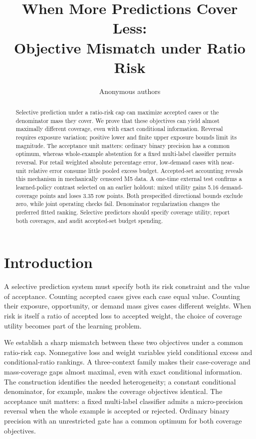 \documentclass{article}
\title{When More Predictions Cover Less:\\Objective Mismatch under Ratio Risk}
\author{Anonymous authors}
\begin{document}
\maketitle
{}
\begin{abstract}
Selective prediction under a ratio-risk cap can maximize accepted cases or the denominator mass they cover. We prove that these objectives can yield almost maximally different coverage, even with exact conditional information. Reversal requires exposure variation; positive lower and finite upper exposure bounds limit its magnitude. The acceptance unit matters: ordinary binary precision has a common optimum, whereas whole-example abstention for a fixed multi-label classifier permits reversal. For retail weighted absolute percentage error, low-demand cases with near-unit relative error consume little pooled excess budget. Accepted-set accounting reveals this mechanism in mechanically censored M5 data. A one-time external test confirms a learned-policy contrast selected on an earlier holdout: mixed utility gains 5.16 demand-coverage points and loses 3.35 row points. Both prespecified directional bounds exclude zero, while joint operating checks fail. Denominator regularization changes the preferred fitted ranking. Selective predictors should specify coverage utility, report both coverages, and audit accepted-set budget spending.
\end{abstract}

\section{Introduction}
A selective prediction system must specify both its risk constraint and the value of acceptance. Counting accepted cases gives each case equal value. Counting their exposure, opportunity, or demand mass gives cases different weights. When risk is itself a ratio of accepted loss to accepted weight, the choice of coverage utility becomes part of the learning problem.

We establish a sharp mismatch between these two objectives under a common ratio-risk cap. Nonnegative loss and weight variables yield conditional excess and conditional-ratio rankings. A three-context family makes their case-coverage and mass-coverage gaps almost maximal, even with exact conditional information. The construction identifies the needed heterogeneity; a constant conditional denominator, for example, makes the coverage objectives identical. The acceptance unit matters: a fixed multi-label classifier admits a micro-precision reversal when the whole example is accepted or rejected. Ordinary binary precision with an unrestricted gate has a common optimum for both coverage objectives.
\end{document}
